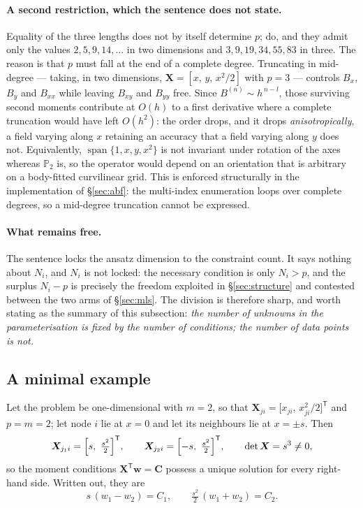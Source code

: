\documentclass[11pt,a4paper]{article}
\begin{document}
\paragraph{A second restriction, which the sentence does not state.} Equality of the
three lengths does not by itself determine $p$; \cite[Eqs.~(15),(16)]{KLN2020} do, and
they admit only the values $2,5,9,14,\dots$ in two dimensions and $3,9,19,34,55,83$ in
three. The reason is that $p$ must fall at the end of a complete degree. Truncating in
mid-degree --- taking, in two dimensions, $\bm X=[x,\,y,\,x^{2}/2]$ with $p=3$ ---
controls $B_{x}$, $B_{y}$ and $B_{xx}$ while leaving $B_{xy}$ and $B_{yy}$ free. Since
$B^{(n)}\sim h^{\,n-l}$, those surviving second moments contribute at $O(h)$ to a first
derivative where a complete truncation would have left $O(h^{2})$: the order drops, and
it drops \emph{anisotropically}, a field varying along $x$ retaining an accuracy that a
field varying along $y$ does not. Equivalently, $\operatorname{span}\{1,x,y,x^{2}\}$ is
not invariant under rotation of the axes whereas $\mathbb P_2$ is, so the operator would
depend on an orientation that is arbitrary on a body-fitted curvilinear grid. This is
enforced structurally in the implementation of \S\ref{sec:abf}: the multi-index
enumeration loops over complete degrees, so a mid-degree truncation cannot be expressed.

\paragraph{What remains free.} The sentence locks the ansatz dimension to the constraint
count. It says nothing about $N_i$, and $N_i$ is not locked: the necessary condition is
only $N_i>p$, and the surplus $N_i-p$ is precisely the freedom exploited in
\S\ref{sec:structure} and contested between the two arms of \S\ref{sec:mls}. The
division is therefore sharp, and worth stating as the summary of this subsection:
\emph{the number of unknowns in the parameterisation is fixed by the number of
conditions; the number of data points is not.}

\subsection{A minimal example}
\label{app:example}

Let the problem be one-dimensional with $m=2$, so that
$\bm X_{ji}=\bigl[x_{ji},\,x_{ji}^{2}/2\bigr]^{\mathsf T}$ and $p=m=2$; let node $i$ lie
at $x=0$ and let its neighbours lie at $x=\pm s$. Then
\begin{equation}
\bm X_{j_1 i}=\Bigl[s,\ \tfrac{s^{2}}{2}\Bigr]^{\mathsf T},
\qquad
\bm X_{j_2 i}=\Bigl[-s,\ \tfrac{s^{2}}{2}\Bigr]^{\mathsf T},
\qquad
\det\bm X=s^{3}\neq0 ,
\label{eq:exX}
\end{equation}
so the moment conditions $\bm X^{\mathsf T}\bm w=\bm C$ possess a unique solution for
every right-hand side. Written out, they are
\begin{equation}
s\,(w_1-w_2)=C_1,
\qquad
\tfrac{s^{2}}{2}\,(w_1+w_2)=C_2 .
\label{eq:excond}
\end{equation}
\end{document}
